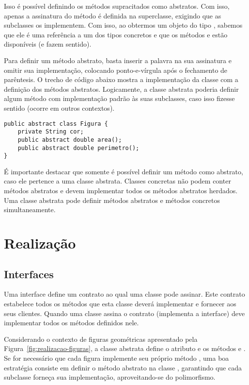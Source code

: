 Isso é possível definindo os métodos supracitados como abstratos. Com isso, apenas a assinatura do método é definida na superclasse, exigindo que as subclasses os implementem. Com isso, ao obtermos um objeto do tipo , sabemos que ele é uma referência a um dos tipos concretos e que os métodos  e  estão disponíveis (e fazem sentido).

Para definir um método abstrato, basta inserir a palavra  na sua assinatura e omitir sua implementação, colocando ponto-e-vírgula após o fechamento de parêntesis. O trecho de código abaixo mostra a implementação da classe  com a definição dos métodos abstratos. Logicamente, a classe abstrata poderia definir algum método com implementação padrão às suas subclasses, caso isso fizesse sentido (ocorre em outros contextos).

\begin{verbatim}
public abstract class Figura {
	private String cor;
	public abstract double area();
	public abstract double perimetro();
}
\end{verbatim}

É importante destacar que somente é possível definir um método como abstrato, caso ele pertence a uma classe abstrata. Classes concretas não podem conter métodos abstratos e devem implementar todos os métodos abstratos herdados. Uma classe abstrata pode definir métodos abstratos e métodos concretos simultaneamente.

\section{Realização}

\subsection{Interfaces}

Uma interface define um contrato ao qual uma classe pode assinar. Este contrato estabelece todos os métodos que esta classe deverá implementar e fornecer aos seus clientes. Quando uma classe assina o contrato (implementa a interface) deve implementar todos os métodos definidos nele.

Considerando o contexto de figuras geométricas apresentado pela Figura~\ref{fig:realizacao-figuras}, a classe abstrata  define o atributo  e os métodos  e . Se for necessário que cada figura implemente seu próprio método , uma boa estratégia consiste em definir o método abstrato  na classe , garantindo que cada subclasse forneça sua implementação, aproveitando-se do polimorfismo.

